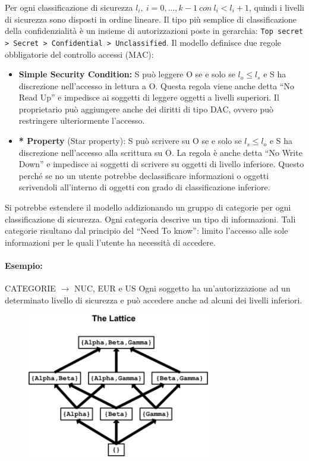 Per ogni classificazione di sicurezza \(l_i, \ i=0,...,k-1 \ con \ l_i<l_i+1\),
quindi i livelli di sicurezza sono
disposti in ordine lineare.
Il tipo più semplice di classificazione della confidenzialità è un insieme di
autorizzazioni poste in
gerarchia: \verb|Top secret > Secret > Confidential > Unclassified|.
Il modello definisce due regole obbligatorie del controllo accessi (MAC):
\begin{itemize}
      \item \textbf{Simple Security Condition:} S può leggere O se e solo se
            \(l_o \le l_s\) e S ha discrezione
            nell'accesso in lettura a O. Questa regola viene anche detta “No Read Up”
            e impedisce ai
            soggetti di leggere oggetti a livelli superiori. Il proprietario può
            aggiungere anche dei diritti di
            tipo DAC, ovvero può restringere ulteriormente l'accesso.
      \item \textbf{* Property} (Star property): S può scrivere su O se e solo
            se \(l_s \le l_o\) e S ha discrezione
            nell'accesso alla scrittura su O. La regola è anche detta “No Write Down”
            e impedisce ai
            soggetti di scrivere su oggetti di livello inferiore. Questo perché se no
            un utente potrebbe declassificare
            informazioni o oggetti scrivendoli all'interno di oggetti con grado di
            classificazione inferiore.
\end{itemize}

Si potrebbe estendere il modello addizionando un gruppo di categorie per ogni
classificazione di
sicurezza. Ogni categoria descrive un tipo di informazioni.
Tali categorie risultano dal principio del “Need To know”: limito l'accesso alle
sole informazioni per
le quali l'utente ha necessità di accedere.

\paragraph{Esempio:} %
CATEGORIE \(\rightarrow\) NUC, EUR e US
Ogni soggetto ha un'autorizzazione ad un determinato livello di sicurezza e può
accedere anche
ad alcuni dei livelli inferiori.

\begin{figure}[H]
      \centering
      \includegraphics[width=8cm, keepaspectratio]{capitoli/policy/imgs/Lattuce.jpg}
\end{figure}

